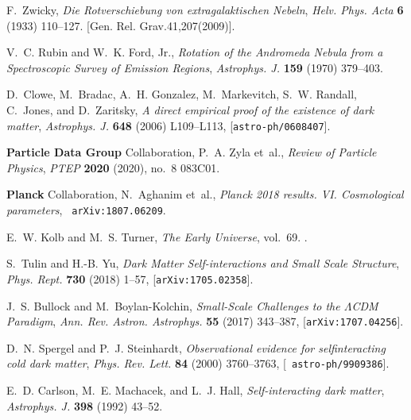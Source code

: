 \documentclass[prd,nofootinbib,preprint,superscriptaddress]{revtex4}
\begin{document}

%
\providecommand{\href}[2]{#2}\begingroup\raggedright\begin{thebibliography}{100}

F.~Zwicky, {\it {Die Rotverschiebung von extragalaktischen Nebeln}},  {\em
  Helv. Phys. Acta} {\bf 6} (1933) 110--127. [Gen. Rel. Grav.41,207(2009)].

V.~C. Rubin and W.~K. Ford, Jr., {\it {Rotation of the Andromeda Nebula from a
  Spectroscopic Survey of Emission Regions}},  {\em Astrophys. J.} {\bf 159}
  (1970) 379--403.

D.~Clowe, M.~Bradac, A.~H. Gonzalez, M.~Markevitch, S.~W. Randall, C.~Jones,
  and D.~Zaritsky, {\it {A direct empirical proof of the existence of dark
  matter}},  {\em Astrophys. J.} {\bf 648} (2006) L109--L113,
  [\href{http://arxiv.org/abs/astro-ph/0608407}{{\tt astro-ph/0608407}}].

{\bf Particle Data Group} Collaboration, P.~A. Zyla et~al., {\it {Review of
  Particle Physics}},  {\em PTEP} {\bf 2020} (2020), no.~8 083C01.

{\bf Planck} Collaboration, N.~Aghanim et~al., {\it {Planck 2018 results. VI.
  Cosmological parameters}},  \href{http://arxiv.org/abs/1807.06209}{{\tt
  arXiv:1807.06209}}.

E.~W. Kolb and M.~S. Turner, {\em {The Early Universe}}, vol.~69.
.

S.~Tulin and H.-B. Yu, {\it {Dark Matter Self-interactions and Small Scale
  Structure}},  {\em Phys. Rept.} {\bf 730} (2018) 1--57,
  [\href{http://arxiv.org/abs/1705.02358}{{\tt arXiv:1705.02358}}].

J.~S. Bullock and M.~Boylan-Kolchin, {\it {Small-Scale Challenges to the
  $\Lambda$CDM Paradigm}},  {\em Ann. Rev. Astron. Astrophys.} {\bf 55} (2017)
  343--387, [\href{http://arxiv.org/abs/1707.04256}{{\tt arXiv:1707.04256}}].

D.~N. Spergel and P.~J. Steinhardt, {\it {Observational evidence for
  selfinteracting cold dark matter}},  {\em Phys. Rev. Lett.} {\bf 84} (2000)
  3760--3763, [\href{http://arxiv.org/abs/astro-ph/9909386}{{\tt
  astro-ph/9909386}}].

E.~D. Carlson, M.~E. Machacek, and L.~J. Hall, {\it {Self-interacting dark
  matter}},  {\em Astrophys. J.} {\bf 398} (1992) 43--52.


\end{thebibliography}
\end{document}
